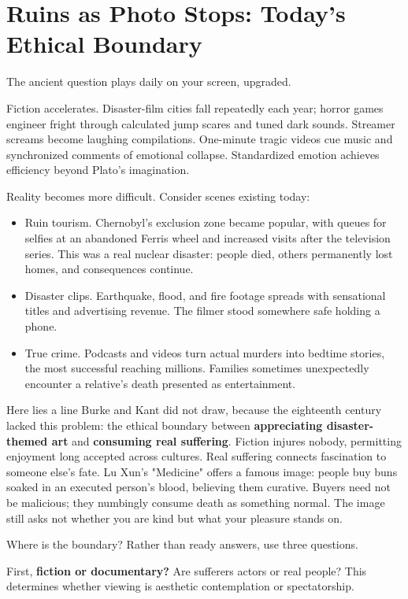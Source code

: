 \section{Ruins as Photo Stops: Today's Ethical Boundary}
The ancient question plays daily on your screen, upgraded.

Fiction accelerates. Disaster-film cities fall repeatedly each year; horror games engineer fright through calculated jump scares and tuned dark sounds. Streamer screams become laughing compilations. One-minute tragic videos cue music and synchronized comments of emotional collapse. Standardized emotion achieves efficiency beyond Plato's imagination.

Reality becomes more difficult. Consider scenes existing today:

\begin{itemize}
\item Ruin tourism. Chernobyl's exclusion zone became popular, with queues for selfies at an abandoned Ferris wheel and increased visits after the television series. This was a real nuclear disaster: people died, others permanently lost homes, and consequences continue.
\item Disaster clips. Earthquake, flood, and fire footage spreads with sensational titles and advertising revenue. The filmer stood somewhere safe holding a phone.
\item True crime. Podcasts and videos turn actual murders into bedtime stories, the most successful reaching millions. Families sometimes unexpectedly encounter a relative's death presented as entertainment.
\end{itemize}
Here lies a line Burke and Kant did not draw, because the eighteenth century lacked this problem: the ethical boundary between \textbf{appreciating disaster-themed art} and \textbf{consuming real suffering}. Fiction injures nobody, permitting enjoyment long accepted across cultures. Real suffering connects fascination to someone else's fate. Lu Xun's "Medicine" offers a famous image: people buy buns soaked in an executed person's blood, believing them curative. Buyers need not be malicious; they numbingly consume death as something normal. The image still asks not whether you are kind but what your pleasure stands on.

Where is the boundary? Rather than ready answers, use three questions.

First, \textbf{fiction or documentary?} Are sufferers actors or real people? This determines whether viewing is aesthetic contemplation or spectatorship.

